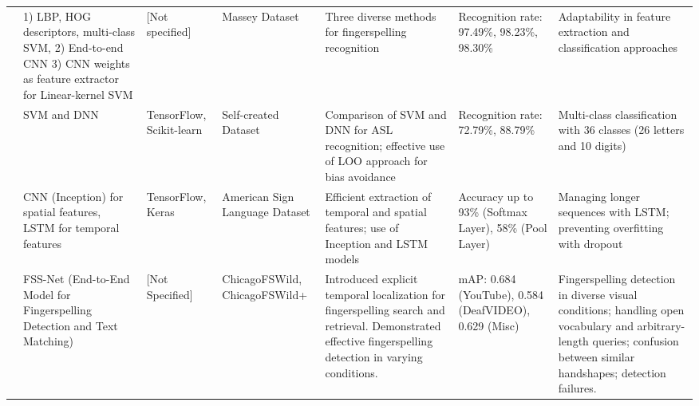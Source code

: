 \begin{longtable}{p{}p{}p{}p{}p{}p{}p{}}
    \cite{nguyenDeepLearningAmerican2019}              & 1) LBP, HOG descriptors, multi-class SVM, 2) End-to-end CNN 3) CNN weights as feature extractor for Linear-kernel SVM & [Not specified]          & Massey Dataset                 & Three diverse methods for fingerspelling recognition                                                                                                      & Recognition rate: 97.49\%, 98.23\%, 98.30\%            & Adaptability in feature extraction and classification approaches                                                                                                        \\

    \cite{chongAmericanSignLanguage2018}               & SVM and DNN                                                                                                           & TensorFlow, Scikit-learn & Self-created Dataset           & Comparison of SVM and DNN for ASL recognition; effective use of LOO approach for bias avoidance                                                           & Recognition rate: 72.79\%, 88.79\%                     & Multi-class classification with 36 classes (26 letters and 10 digits)                                                                                                   \\

    \cite{bantupalliAmericanSignLanguage2018}          & CNN (Inception) for spatial features, LSTM for temporal features                                                      & TensorFlow, Keras        & American Sign Language Dataset & Efficient extraction of temporal and spatial features; use of Inception and LSTM models                                                                   & Accuracy up to 93\% (Softmax Layer), 58\% (Pool Layer) & Managing longer sequences with LSTM; preventing overfitting with dropout                                                                                                \\

    \cite{shiSearchingFingerspelledContent2022}        & FSS-Net (End-to-End Model for Fingerspelling Detection and Text Matching)                                             & [Not Specified]          & ChicagoFSWild, ChicagoFSWild+  & Introduced explicit temporal localization for fingerspelling search and retrieval. Demonstrated effective fingerspelling detection in varying conditions. & mAP: 0.684 (YouTube), 0.584 (DeafVIDEO), 0.629 (Misc)  & Fingerspelling detection in diverse visual conditions; handling open vocabulary and arbitrary-length queries; confusion between similar handshapes; detection failures. \\


\end{longtable}
